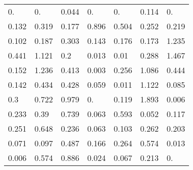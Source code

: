 \begin{tabular}{|lllllll|}
\color[HTML]{909090}0. & \color[HTML]{909090}0. & \color[HTML]{808080}0.044 & \color[HTML]{909090}0. & \color[HTML]{909090}0. & \color[HTML]{707070}0.114 & \color[HTML]{909090}0. \\ 
\color[HTML]{606060}0.132 & \color[HTML]{303030}0.319 & \color[HTML]{505050}0.177 & \color[HTML]{000000}0.896 & \color[HTML]{000000}0.504 & \color[HTML]{404040}0.252 & \color[HTML]{505050}0.219 \\ 
\color[HTML]{707070}0.102 & \color[HTML]{505050}0.187 & \color[HTML]{303030}0.303 & \color[HTML]{606060}0.143 & \color[HTML]{505050}0.176 & \color[HTML]{606060}0.173 & \color[HTML]{000000}1.235 \\ 
\color[HTML]{000000}0.441 & \color[HTML]{000000}1.121 & \color[HTML]{505050}0.2 & \color[HTML]{909090}0.013 & \color[HTML]{909090}0.01 & \color[HTML]{303030}0.288 & \color[HTML]{000000}1.467 \\ 
\color[HTML]{606060}0.152 & \color[HTML]{000000}1.236 & \color[HTML]{101010}0.413 & \color[HTML]{909090}0.003 & \color[HTML]{404040}0.256 & \color[HTML]{000000}1.086 & \color[HTML]{000000}0.444 \\ 
\color[HTML]{606060}0.142 & \color[HTML]{000000}0.434 & \color[HTML]{000000}0.428 & \color[HTML]{808080}0.059 & \color[HTML]{909090}0.011 & \color[HTML]{000000}1.122 & \color[HTML]{707070}0.085 \\ 
\color[HTML]{303030}0.3 & \color[HTML]{000000}0.722 & \color[HTML]{000000}0.979 & \color[HTML]{909090}0. & \color[HTML]{707070}0.119 & \color[HTML]{000000}1.893 & \color[HTML]{909090}0.006 \\ 
\color[HTML]{404040}0.233 & \color[HTML]{101010}0.39 & \color[HTML]{000000}0.739 & \color[HTML]{808080}0.063 & \color[HTML]{000000}0.593 & \color[HTML]{808080}0.052 & \color[HTML]{707070}0.117 \\ 
\color[HTML]{404040}0.251 & \color[HTML]{000000}0.648 & \color[HTML]{404040}0.236 & \color[HTML]{808080}0.063 & \color[HTML]{707070}0.103 & \color[HTML]{404040}0.262 & \color[HTML]{505050}0.203 \\ 
\color[HTML]{808080}0.071 & \color[HTML]{707070}0.097 & \color[HTML]{000000}0.487 & \color[HTML]{606060}0.166 & \color[HTML]{404040}0.264 & \color[HTML]{000000}0.574 & \color[HTML]{909090}0.013 \\ 
\color[HTML]{909090}0.006 & \color[HTML]{000000}0.574 & \color[HTML]{000000}0.886 & \color[HTML]{909090}0.024 & \color[HTML]{808080}0.067 & \color[HTML]{505050}0.213 & \color[HTML]{909090}0.
\end{tabular}
